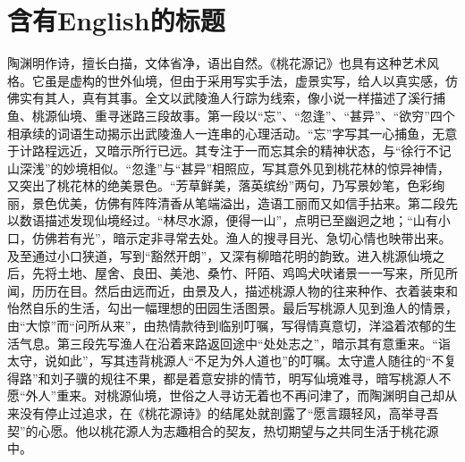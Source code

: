 \documentclass[type=bachelor]{cquthesis}
\begin{document}
	\frontmatter
	
	\makecover
	
	\mainmatter
	\chapter{含有English的标题}
	陶渊明作诗，擅长白描，文体省净，语出自然。《桃花源记》也具有这种艺术风格。它虽是虚构的世外仙境，但由于采用写实手法，虚景实写，给人以真实感，仿佛实有其人，真有其事。全文以武陵渔人行踪为线索，像小说一样描述了溪行捕鱼、桃源仙境、重寻迷路三段故事。第一段以“忘”、“忽逢”、“甚异”、“欲穷”四个相承续的词语生动揭示出武陵渔人一连串的心理活动。“忘”字写其一心捕鱼，无意于计路程远近，又暗示所行已远。其专注于一而忘其余的精神状态，与“徐行不记山深浅”的妙境相似。“忽逢”与“甚异”相照应，写其意外见到桃花林的惊异神情，又突出了桃花林的绝美景色。“芳草鲜美，落英缤纷”两句，乃写景妙笔，色彩绚丽，景色优美，仿佛有阵阵清香从笔端溢出，造语工丽而又如信手拈来。第二段先以数语描述发现仙境经过。“林尽水源，便得一山”，点明已至幽迥之地；“山有小口，仿佛若有光”，暗示定非寻常去处。渔人的搜寻目光、急切心情也映带出来。及至通过小口狭道，写到“豁然开朗”，又深有柳暗花明的韵致。进入桃源仙境之后，先将土地、屋舍、良田、美池、桑竹、阡陌、鸡鸣犬吠诸景一一写来，所见所闻，历历在目。然后由远而近，由景及人，描述桃源人物的往来种作、衣着装束和怡然自乐的生活，勾出一幅理想的田园生活图景。最后写桃源人见到渔人的情景，由“大惊”而“问所从来”，由热情款待到临别叮嘱，写得情真意切，洋溢着浓郁的生活气息。第三段先写渔人在沿着来路返回途中“处处志之”，暗示其有意重来。“诣太守，说如此”，写其违背桃源人“不足为外人道也”的叮嘱。太守遣人随往的“不复得路”和刘子骥的规往不果，都是着意安排的情节，明写仙境难寻，暗写桃源人不愿“外人”重来。对桃源仙境，世俗之人寻访无着也不再问津了，而陶渊明自己却从来没有停止过追求，在《桃花源诗》的结尾处就剖露了“愿言蹑轻风，高举寻吾契”的心愿。他以桃花源人为志趣相合的契友，热切期望与之共同生活于桃花源中。
	
	\cquauthpage
	
\end{document}
